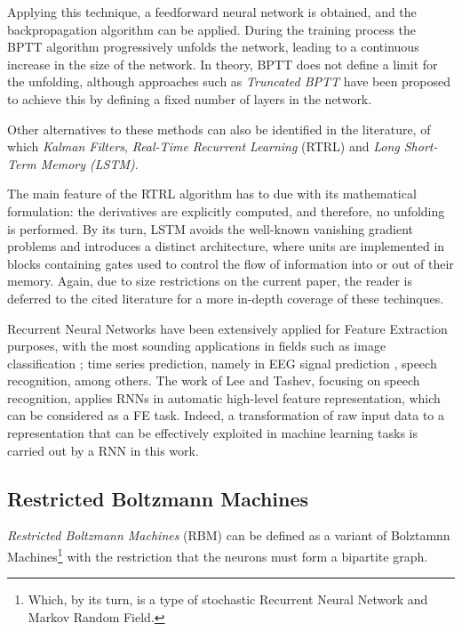 \documentclass[9pt,journal,compsoc]{IEEEtran}
\begin{document}
Applying this technique, a feedforward neural network is obtained, and the backpropagation algorithm can be applied. During the training process the BPTT algorithm progressively unfolds the network, leading to a continuous increase in the size of the network. In theory, BPTT does not define a limit for the unfolding, although approaches such as \emph{Truncated BPTT} have been proposed to achieve this by defining a fixed number of layers in the network.

Other alternatives to these methods can also be identified in the literature, of which \emph{Kalman Filters}\cite{kalman1960new}, \emph{Real-Time Recurrent Learning} (RTRL)\cite{williams1989learning} and \emph{Long Short-Term Memory (LSTM)}\cite{hochreiter1997long}.

The main feature of the RTRL algorithm has to due with its mathematical formulation: the derivatives are explicitly computed, and therefore, no unfolding is performed. By its turn, LSTM avoids the well-known vanishing gradient problems and introduces a distinct architecture, where units are implemented in blocks containing gates used to control the flow of information into or out of their memory. Again, due to size restrictions on the current paper, the reader is deferred to the cited literature for a more in-depth coverage of these techinques.

Recurrent Neural Networks have been extensively applied for Feature Extraction purposes, with the most sounding applications in fields such as image classification \cite{graves2009offline}; time series prediction, namely in EEG signal prediction \cite{prasad2014deep}, speech recognition\cite{lee2015high}, among others. The work of Lee and Tashev\cite{lee2015high}, focusing on speech recognition, applies RNNs in automatic high-level feature representation, which can be considered as a FE task. Indeed, a transformation of raw input data to a representation that can be effectively exploited in machine learning tasks is carried out by a RNN in this work.

\subsection{Restricted Boltzmann Machines}

\emph{Restricted Boltzmann Machines} (RBM)\cite{smolensky1986information} can be defined as a variant of Bolztamnn Machines\footnote{Which, by its turn, is a type of stochastic Recurrent Neural Network and Markov Random Field.} \cite{ackley1985learning} with the restriction that the neurons must form a bipartite graph.
\end{document}
